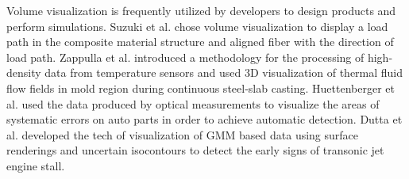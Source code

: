 \documentclass[a4paper,fleqn]{cas-dc}
\begin{document}
Volume visualization is frequently utilized by developers to design products and perform simulations.
Suzuki et al. \cite{Suzuki2020} chose volume visualization to display a load path in the composite material structure and aligned fiber with the direction of load path.
Zappulla et al. \cite{Zappulla2019} introduced a methodology for the processing of high-density data from temperature sensors and used 3D visualization of thermal fluid flow fields in mold region during continuous steel-slab casting.
Huettenberger et al. \cite{Huettenberger2015} used the data produced by optical measurements to visualize the areas of systematic errors on auto parts in order to achieve automatic detection.
Dutta et al. \cite{dutta2016situ} developed the tech of visualization of GMM based data using surface renderings and uncertain isocontours to detect the early signs of transonic jet engine stall.

\end{document}
